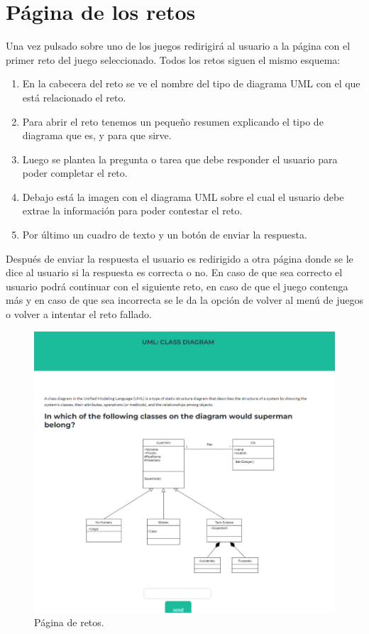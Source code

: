 \documentclass[a4paper, 12pt]{book}
\begin{document}
\section{Página de los retos}
Una vez pulsado sobre uno de los juegos redirigirá al usuario a la página con el primer reto del juego seleccionado. Todos los retos siguen el mismo esquema: 
\begin{enumerate}
	\item En la cabecera del reto se ve el nombre del tipo de diagrama UML con el que está relacionado el reto.
	\item Para abrir el reto tenemos un pequeño resumen explicando el tipo de diagrama que es, y para que sirve. 
	\item Luego se plantea la pregunta o tarea que debe responder el usuario para poder completar el reto. 
	\item Debajo está la imagen con el diagrama UML sobre el cual el usuario debe extrae la información para poder contestar el reto.
	\item Por último un cuadro de texto y un botón de enviar la respuesta. 
\end{enumerate}
Después de enviar la respuesta el usuario es redirigido a otra página donde se le dice al usuario si la respuesta es correcta o no. En caso de que sea correcto el usuario podrá continuar con el siguiente reto, en caso de que el juego contenga más y en caso de que sea incorrecta se le da la opción de volver al menú de juegos o volver a intentar el reto fallado. 
\begin{figure}
	\centering
	\includegraphics[width=16cm, keepaspectratio]{img/challenge_html.png}
	\caption{Página de retos.}\label{fig:challenge}
\end{figure}
\end{document}

